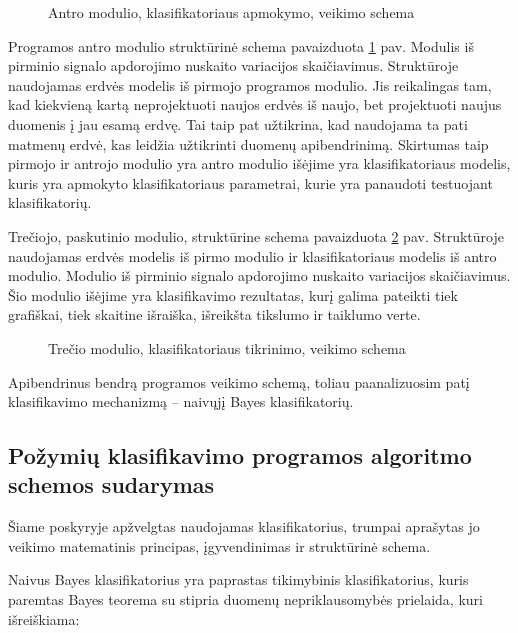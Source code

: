\documentclass[]{vgtuef}
\begin{document}
\begin{figure}
  \centering
  
  \caption{Antro modulio, klasifikatoriaus apmokymo, veikimo schema}
  \label{fig:antra_faze}
\end{figure}

Programos antro modulio struktūrinė schema pavaizduota \ref{fig:antra_faze} pav. Modulis iš pirminio signalo apdorojimo nuskaito variacijos skaičiavimus. Struktūroje naudojamas erdvės modelis iš pirmojo programos modulio. Jis reikalingas tam, kad kiekvieną kartą neprojektuoti naujos erdvės iš naujo, bet projektuoti naujus duomenis į jau esamą erdvę. Tai taip pat užtikrina, kad naudojama ta pati matmenų erdvė, kas leidžia užtikrinti duomenų apibendrinimą. Skirtumas taip pirmojo ir antrojo modulio yra antro modulio išėjime yra klasifikatoriaus modelis, kuris yra apmokyto klasifikatoriaus parametrai, kurie yra panaudoti testuojant klasifikatorių.

Trečiojo, paskutinio modulio, struktūrine schema pavaizduota \ref{fig:trecia_faze} pav. Struktūroje naudojamas erdvės modelis iš pirmo modulio ir klasifikatoriaus modelis iš antro modulio. Modulio iš pirminio signalo apdorojimo nuskaito variacijos skaičiavimus. Šio modulio išėjime yra klasifikavimo rezultatas, kurį galima pateikti tiek grafiškai, tiek skaitine išraiška, išreikšta tikslumo ir taiklumo verte.

\begin{figure}
  \centering
  
  \caption{Trečio modulio, klasifikatoriaus tikrinimo, veikimo schema}
  \label{fig:trecia_faze}
\end{figure}

Apibendrinus bendrą programos veikimo schemą, toliau paanalizuosim patį klasifikavimo mechanizmą -- naivųjį Bayes klasifikatorių.

\subsection{Požymių klasifikavimo programos algoritmo schemos sudarymas}
\label{subsec:class_scheme}

Šiame poskyryje apžvelgtas naudojamas klasifikatorius, trumpai aprašytas jo veikimo matematinis principas, įgyvendinimas ir struktūrinė schema.

Naivus Bayes klasifikatorius \cite{R22230} yra paprastas tikimybinis klasifikatorius, kuris paremtas Bayes teorema su stipria duomenų nepriklausomybės prielaida, kuri išreiškiama:
\end{document}
